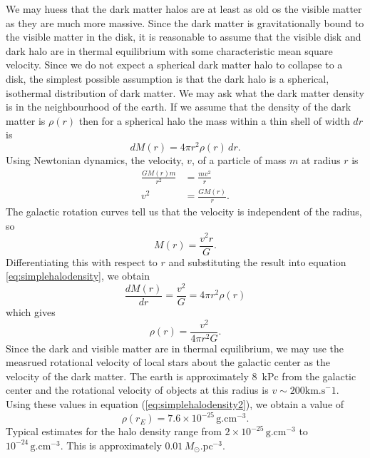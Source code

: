We may huess that the dark matter halos are at least as old os the visible
matter as they are much more massive. Since the dark matter is gravitationally
bound to the visible matter in the disk, it is reasonable to assume that the
visible disk and dark halo are in thermal equilibrium with some characteristic
mean square velocity. Since we do not expect a spherical dark matter halo to
collapse to a disk, the simplest possible assumption is that the dark halo is
a spherical, isothermal distribution of dark matter. We may ask what the
dark matter density is in the neighbourhood of the earth. If we assume that
the density of the dark matter is $\rho(r)$ then for a spherical halo the mass
within a thin shell of width $dr$ is
\begin{equation}
dM(r) = 4\pi r^2 \rho(r)\, dr.
\label{eq:simplehalodensity}
\end{equation}
Using Newtonian dynamics, the velocity, $v$, of a particle of mass $m$ at
radius $r$ is
\begin{equation}
\begin{split}
\frac{GM(r)m}{r^2} &= \frac{mv^2}{r} \\
v^2 &= \frac{GM(r)}{r}.
\end{split}
\end{equation}
The galactic rotation curves tell us that the velocity is independent of the
radius, so
\begin{equation}
M(r) = \frac{v^2r}{G}.
\end{equation}
Differentiating this with respect to $r$ and substituting the result into
equation \ref{eq:simplehalodensity}, we obtain
\begin{equation}
\frac{dM(r)}{dr} = \frac{v^2}{G} = 4\pi r^2\rho(r)
\end{equation}
which gives
\begin{equation}
\rho(r) = \frac{v^2}{4\pi r^2 G}.
\label{eq:simplehalodensity2}
\end{equation}
Since the dark and visible matter are in thermal equilibrium, we may use the
measrued rotational velocity of local stars about the galactic center as the
velocity of the dark matter. The earth is approximately $8$~kPc from the
galactic center and the rotational velocity of objects at this radius is
$v\sim 200\mathrm{km.s}^-1$. Using these values in equation
(\ref{eq:simplehalodensity2}), we obtain a value of
\begin{equation}
\rho(r_E) = 7.6 \times 10^{-25}\, \mathrm{g}.\mathrm{cm}^{-3}.
\end{equation}
Typical estimates for the halo density range from $2\times
10^{-25}\,\mathrm{g}.\mathrm{cm}^{-3}$ to
$10^{-24}\,\mathrm{g}.\mathrm{cm}^{-3}$\cite{XXX}. This is approximately
$0.01\,M_\odot.\mathrm{pc}^{-3}$.

